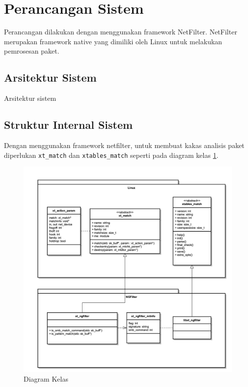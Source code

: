 \section{Perancangan Sistem}

Perancangan dilakukan dengan menggunakan framework NetFilter. NetFilter merupakan framework native yang dimiliki oleh Linux untuk melakukan pemrosesan paket.


\subsection{Arsitektur Sistem}

Arsitektur sistem 

\subsection{Struktur Internal Sistem}

Dengan menggunakan framework netfilter, untuk membuat kakas analisis paket diperlukan \verb|xt_match| dan \verb|xtables_match| seperti pada diagram kelas \ref{fig:class_diagram}.

\begin{figure}[H]
	\centering
	\includegraphics[width=\textwidth]{resources/ngfilter_class_diagram.png}
	\caption{Diagram Kelas}
	\label{fig:class_diagram}
\end{figure}

